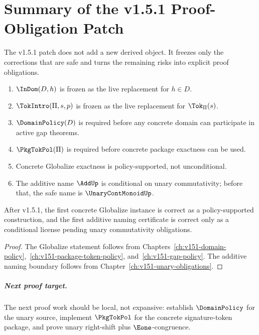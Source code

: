 \chapter{Summary of the v1.5.1 Proof-Obligation Patch}
\label{ch:v151-summary}

The v1.5.1 patch does not add a new derived object. It freezes only the corrections that are safe and turns the remaining risks into explicit proof obligations.

\begin{enumerate}
  \item \(\InDom(D,h)\) is frozen as the live replacement for \(h\in D\).
  \item \(\TokIntro(\Pi,s,p)\) is frozen as the live replacement for \(\Tok_{\Pi}(s)\).
  \item \(\DomainPolicy(D)\) is required before any concrete domain can participate in active gap theorems.
  \item \(\PkgTokPol(\Pi)\) is required before concrete package exactness can be used.
  \item Concrete Globalize exactness is policy-supported, not unconditional.
  \item The additive name \(\AddUp\) is conditional on unary commutativity; before that, the safe name is \(\UnaryContMonoidUp\).
\end{enumerate}

\begin{corollary}
After v1.5.1, the first concrete Globalize instance is correct as a policy-supported construction, and the first additive naming certificate is correct only as a conditional license pending unary commutativity obligations.
\end{corollary}

\begin{proof}
The Globalize statement follows from Chapters~\ref{ch:v151-domain-policy},~\ref{ch:v151-package-token-policy}, and~\ref{ch:v151-gap-policy}. The additive naming boundary follows from Chapter~\ref{ch:v151-unary-obligations}.
\end{proof}

\paragraph{Next proof target.}
The next proof work should be local, not expansive: establish \(\DomainPolicy\) for the unary source, implement \(\PkgTokPol\) for the concrete signature-token package, and prove unary right-shift plus \(\Eone\)-congruence.
